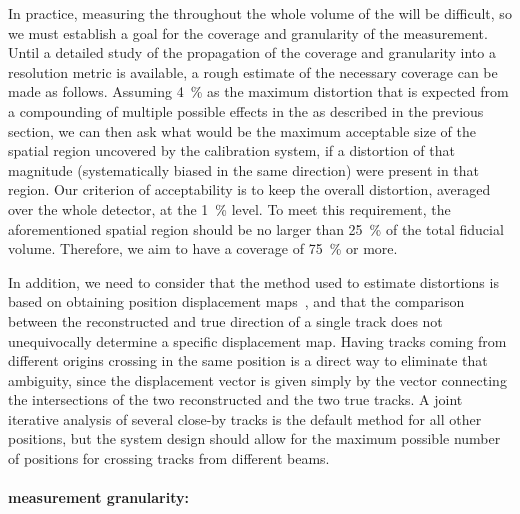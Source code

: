 In practice, measuring the \efield  throughout the whole volume
of the  will be difficult, 
so we must establish a goal for the coverage and granularity of the measurement. 
Until a detailed study of the propagation of the coverage and granularity into a resolution metric is available, 
a rough estimate of the necessary coverage can be made as follows.
Assuming \SI{4}{\%} as the maximum \efield distortion %
that is %
expected from a compounding of multiple possible effects in the   %
as described in the previous section,
we can then ask what would be the maximum acceptable size of the spatial region uncovered by the calibration system, if a distortion of that magnitude (systematically biased in the same direction) were present in that region. Our criterion of acceptability is to keep the overall \efield distortion, averaged over the whole detector, at the \SI{1}{\%} level. 
To meet this requirement, the aforementioned spatial region should be no larger than \SI{25}{\%} of the total fiducial volume. Therefore, we aim to have a coverage of \SI{75}{\%} or more.

In addition, we need to consider that the method used to estimate \efield distortions is based on obtaining position displacement maps~\cite{bib:uBlaser2019}, and that the comparison between the reconstructed and true direction of a single track does not %
unequivocally determine a specific displacement map. Having tracks coming from different origins crossing in the same position is a direct way to eliminate that ambiguity, since the displacement vector is given simply by the vector connecting the intersections of the two reconstructed and the two true tracks. A joint iterative analysis of several close-by tracks is the default method for all other positions, but the system design should allow for the maximum possible number of positions %
for crossing tracks from different beams.

\paragraph{\efield measurement granularity:}


